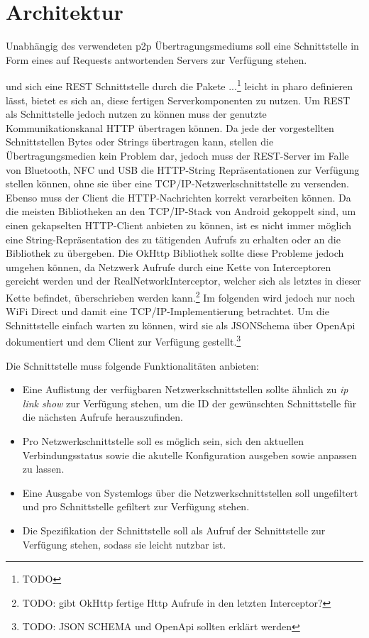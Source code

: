 \section{Architektur}
    Unabhängig des verwendeten p2p Übertragungsmediums soll eine Schnittstelle in Form eines auf Requests antwortenden Servers zur Verfügung stehen.

    und sich eine REST Schnittstelle durch die Pakete ...\footnote{TODO} leicht in pharo definieren lässt, bietet es sich an, diese fertigen Serverkomponenten zu nutzen.
    Um REST als Schnittstelle jedoch nutzen zu können muss der genutzte Kommunikationskanal HTTP übertragen können. Da jede der vorgestellten Schnittstellen Bytes oder Strings
    übertragen kann, stellen die Übertragungsmedien kein Problem dar, jedoch muss der REST-Server im Falle von Bluetooth, NFC und USB die HTTP-String Repräsentationen zur Verfügung stellen können,
    ohne sie über eine TCP/IP-Netzwerkschnittstelle zu versenden. Ebenso muss der Client die HTTP-Nachrichten korrekt verarbeiten können.
    Da die meisten Bibliotheken an den TCP/IP-Stack von Android gekoppelt sind, um einen gekapselten HTTP-Client anbieten zu können, ist es nicht immer möglich eine String-Repräsentation des zu tätigenden Aufrufs zu erhalten oder an die Bibliothek zu übergeben.
    Die OkHttp Bibliothek sollte diese Probleme jedoch umgehen können, da Netzwerk Aufrufe durch eine Kette von Interceptoren gereicht werden und der RealNetworkInterceptor,
    welcher sich als letztes in dieser Kette befindet, überschrieben werden kann.\footnote{TODO: gibt OkHttp fertige Http Aufrufe in den letzten Interceptor?}
	Im folgenden wird jedoch nur noch WiFi Direct und damit eine TCP/IP-Implementierung betrachtet.
    Um die Schnittstelle einfach warten zu können, wird sie als JSONSchema über OpenApi dokumentiert und dem Client zur Verfügung gestellt.\footnote{TODO: JSON SCHEMA und OpenApi sollten erklärt werden}

    Die Schnittstelle muss folgende Funktionalitäten anbieten:
    \begin{itemize}
        \item Eine Auflistung der verfügbaren Netzwerkschnittstellen sollte ähnlich zu {\it ip link show} zur Verfügung stehen, um die ID der gewünschten Schnittstelle für die nächsten Aufrufe herauszufinden.
        \item Pro Netzwerkschnittstelle soll es möglich sein, sich den aktuellen Verbindungsstatus sowie die akutelle Konfiguration ausgeben sowie anpassen zu lassen.
        \item Eine Ausgabe von Systemlogs über die Netzwerkschnittstellen soll ungefiltert und pro Schnittstelle gefiltert zur Verfügung stehen.
        \item Die Spezifikation der Schnittstelle soll als Aufruf der Schnittstelle zur Verfügung stehen, sodass sie leicht nutzbar ist.
    \end{itemize}

